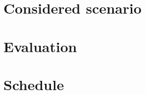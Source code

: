 \documentclass[
	a4paper,
	11pt,
	twoside,
	twocolumn
]{article}
\begin{document}
	\section{Considered scenario}
	
		
	\section{Evaluation}
	
		
	
	\section{Schedule}
	
	
	\printbibliography
\end{document}
